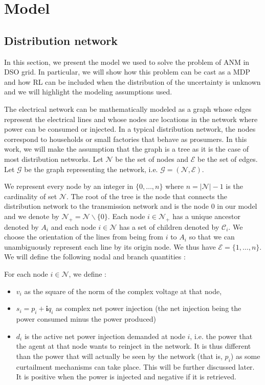 \section{Model}
\label{sec:model}

\subsection{Distribution network}

In this section, we present the model we used to solve the problem of ANM in DSO grid.
In particular, we will show how this problem can be cast as a MDP and how RL can be included when the distribution of the uncertainty is unknown and we will highlight the modeling assumptions used.

The electrical network can be mathematically modeled as a graph whose edges represent the electrical lines and whose nodes are locations in the network where power can be consumed or injected.
In a typical distribution network, the nodes correspond to households or small factories that behave as prosumers.
In this work, we will make the assumption that the graph is a tree as it is the case of most distribution networks.
Let $\mathcal{N}$ be the set of nodes and $\mathcal{E}$ be the set of edges.
Let $\mathcal{G}$ be the graph representing the network, i.e. $\mathcal{G} = (\mathcal{N}, \mathcal{E})$.

We represent every node by an integer in $\{0, \dots, n\}$ where $n = |\mathcal{N}|-1$ is the cardinality of set $\mathcal{N}$.
The root of the tree is the node that connects the distribution network to the transmission network and is the node $0$ in our model and we denote by $\mathcal{N}_+ = \mathcal{N} \backslash \{0\}$.
Each node $i \in \mathcal{N}_+$ has a unique ancestor denoted by $A_i$ and each node $i \in \mathcal{N}$ has a set of children denoted by $\mathcal{C}_i$.
We choose the orientation of the lines from being from $i$ to $A_i$ so that we can unambiguously represent each line by its origin node.
We thus have $\mathcal{E} = \{1, \dots, n\}$.
We will define the following nodal and branch quantities :

For each node $i \in \mathcal{N}$, we define :
\begin{itemize}
  \item $v_i$ as the square of the norm of the complex voltage at that node,
  \item $s_i = p_i + \mathbf{i} q_i$ as complex net power injection (the net injection being the power consumed minus the power produced)
  \item $d_i$ is the active net power injection demanded at node $i$, i.e. the power that the agent at that node wants to reinject in the network.
  It is thus different than the power that will actually be seen by the network (that is, $p_{i}$) as some curtailment mechanisms can take place.
  This will be further discussed later.
  It is positive when the power is injected and negative if it is retrieved.
\end{itemize}

